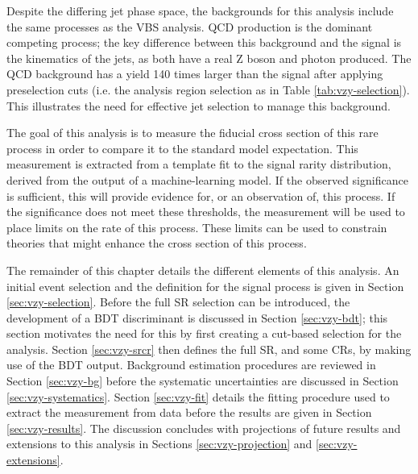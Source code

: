 Despite the differing jet phase space, the backgrounds for this analysis include
the same processes as the \ac{VBS} \Zy analysis. \ac{QCD} \Zyjj production is the dominant
competing process; the key difference between this background and the signal
is the kinematics of the jets, as both have a real Z boson and photon produced.
%
The QCD \Zy background has a yield 140 times larger than the signal after
applying preselection cuts (i.e. the analysis region selection as in Table
\ref{tab:vzy-selection}).  This illustrates the need for effective jet selection
to manage this background.

The goal of this analysis is to measure the fiducial cross section of this rare
process in order to compare it to the standard model expectation.  This
measurement is extracted from a template fit to the signal rarity
distribution, derived from the output of a machine-learning model. If the
observed significance is sufficient, this will provide evidence for, or an
observation of, this process. If the significance does not meet these
thresholds, the measurement will be used to place limits on the rate of this
process. These limits can be used to constrain theories that might enhance the
cross section of this process.

The remainder of this chapter details the different elements of this analysis.
An initial event selection and the definition for the signal process is given in
Section \ref{sec:vzy-selection}. Before the full \ac{SR} selection can be
introduced, the development of a \ac{BDT} discriminant is discussed in Section
\ref{sec:vzy-bdt}; this section motivates the need for this by first creating a
cut-based selection for the analysis. Section \ref{sec:vzy-srcr} then defines
the full \ac{SR}, and some \acp{CR}, by making use of the \ac{BDT} output.
Background estimation procedures are reviewed in Section \ref{sec:vzy-bg} before
the systematic uncertainties are discussed in Section \ref{sec:vzy-systematics}.
Section \ref{sec:vzy-fit} details the fitting procedure used to extract the
measurement from data before the results are given in Section
\ref{sec:vzy-results}. The discussion concludes with projections of future
results and extensions to this analysis in Sections \ref{sec:vzy-projection} and
\ref{sec:vzy-extensions}.


